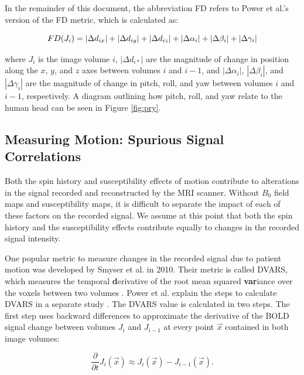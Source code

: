 In the remainder of this document, the abbreviation FD refers to Power et al.'s version of the FD metric, which is calculated as:

\begin{equation}
FD(J_i) = | \Delta d_{ix} | + | \Delta d_{iy} | + | \Delta d_{iz} | \\ + | \Delta \alpha_i | + | \Delta \beta_i | + | \Delta \gamma_i |
\end{equation}

\noindent where $J_i$ is the image volume $i$, $| \Delta d_{i *} |$ are the magnitude of change in position along the $x$, $y$, and $z$ axes between volumes $i$ and $i-1$, and $| \Delta \alpha_i |$, $| \Delta \beta_i |$, and $| \Delta \gamma_i |$ are the magnitude of change in pitch, roll, and yaw between volumes $i$ and $i-1$, respectively. A diagram outlining how pitch, roll, and yaw relate to the human head can be seen in Figure \ref{fig:pry}.

\subsection{Measuring Motion: Spurious Signal Correlations}

Both the spin history and susceptibility effects of motion contribute to alterations in the signal recorded and reconstructed by the MRI scanner. Without $B_0$ field maps and susceptibility maps, it is difficult to separate the impact of each of these factors on the recorded signal. We assume at this point that both the spin history and the susceptibility effects contribute equally to changes in the recorded signal intensity.

One popular metric to measure changes in the recorded signal due to patient motion was developed by Smyser et al. in 2010. Their metric is called DVARS, which measures the temporal \textbf{d}erivative of the root mean squared \textbf{var}iance over the voxels between two volumes \cite{Smyser2010}. Power et al. explain the steps to calculate DVARS in a separate study \cite{Power2012}. The DVARS value is calculated in two steps. The first step uses backward differences to approximate the derivative of the BOLD signal change between volumes $J_i$ and $J_{i-1}$ at every point $\vec{x}$ contained in both image volumes:

\begin{equation}
\frac{\partial}{\partial t} J_i(\vec{x}) \approx J_i(\vec{x}) - J_{i-1}(\vec{x}).
\end{equation}

